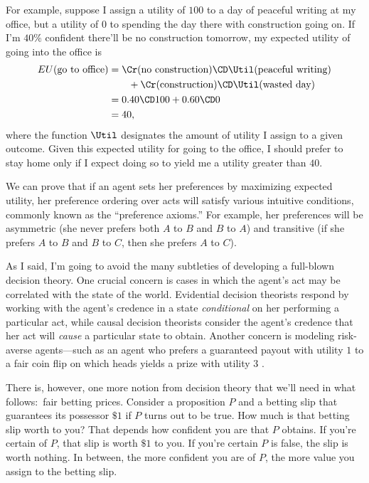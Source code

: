 For example, suppose I assign a utility of $100$ to a day of peaceful writing at my office, but a utility of $0$ to spending the day there with construction going on. If I'm $40\%$ confident there'll be no construction tomorrow, my expected utility of going into the office is
\begin{equation}
\begin{aligned}
EU(\text{go to office}) &= \Cr(\text{no construction}) \CD \Util(\text{peaceful writing})\\
                        &\qquad + \Cr(\text{construction}) \CD \Util(\text{wasted day})\\
						&= 0.40 \CD 100 + 0.60 \CD 0\\
						&= 40,
\end{aligned}
\end{equation}
where the function $\Util$ designates the amount of utility I assign to a given outcome. Given this expected utility for going to the office, I should prefer to stay home only if I expect doing so to yield me a utility greater than $40$. 

We can prove that if an agent sets her preferences by maximizing expected utility, her preference ordering over acts will satisfy various intuitive conditions, commonly known as the ``preference axioms.'' For example, her preferences will be asymmetric (she never prefers both $A$ to $B$ and $B$ to $A$) and transitive (if she prefers $A$ to $B$ and $B$ to $C$, then she prefers $A$ to $C$).

As I said, I'm going to avoid the many subtleties of developing a full-blown decision theory. One crucial concern is cases in which the agent's act may be correlated with the state of the world. Evidential decision theorists \citep{JeffreyLogic} respond by working with the agent's credence in a state \emph{conditional} on her performing a particular act, while causal decision theorists \citep{GibbardHarper,LewisCausal,JoyceCausal,WeirichCausal} consider the agent's credence that her act will \emph{cause} a particular state to obtain. Another concern is modeling risk-averse agents---such as an agent who prefers a guaranteed payout with utility $1$ to a fair coin flip on which heads yields a prize with utility $3$ \citep{Allais,BuchakRisk}.

There is, however, one more notion from decision theory that we'll need in what follows:\ fair betting prices. Consider a proposition $P$ and a betting slip that guarantees its possessor $\$1$ if $P$ turns out to be true. How much is that betting slip worth to you? That depends how confident you are that $P$ obtains. If you're certain of $P$, that slip is worth $\$1$ to you. If you're certain $P$ is false, the slip is worth nothing. In between, the more confident you are of $P$, the more value you assign to the betting slip.


